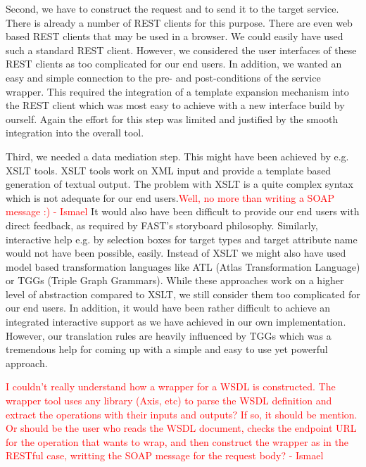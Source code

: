 \documentclass{fast_latex}
\begin{document}
Second, we have to construct the request and to send it to the target service. There is already a number of REST clients 
for this purpose. There are even web based REST clients that may be used in a browser. We could easily have used such 
a standard REST client. However, we considered the user interfaces of these REST clients as too complicated for our
end users. In addition, we wanted an easy and simple connection to the pre- and post-conditions of the service wrapper. 
This required the integration of a template expansion mechanism into the REST client which was most easy to achieve 
with a new interface build by ourself. Again the effort for this step was limited and justified by the smooth integration into the overall tool. 

Third, we needed a data mediation step. This might have been achieved by e.g. XSLT tools. XSLT tools work on 
XML input and provide a template based generation of textual output. The problem with XSLT is a quite 
complex syntax which is not adequate for our end users.\textcolor{red}{Well, no more than writing a SOAP message :) - Ismael} It would also have been difficult to provide our end users with direct feedback, as required by FAST's storyboard philosophy. Similarly, interactive help e.g. by selection boxes for target types and target attribute name would not have been possible, easily. Instead of XSLT we might also have used model based transformation languages like ATL (Atlas Transformation Language) or TGGs (Triple Graph Grammars). While these approaches work on a higher level of abstraction compared to XSLT, we still consider them too complicated for our end users. 
In addition, it would have been rather difficult to achieve an integrated interactive support as we have achieved in our 
own implementation. However, our translation rules are heavily influenced by TGGs which was a tremendous help 
for coming up with a simple and easy to use yet powerful approach. 

\textcolor{red}{I couldn't really understand how a wrapper for a WSDL is constructed. The wrapper tool uses any library (Axis, etc) to parse the WSDL definition and extract the operations with their inputs and outputs? If so, it should be mention. Or should be the user who reads the WSDL document, checks the endpoint URL for the operation that wants to wrap, and then construct the wrapper as in the RESTful case, writting the SOAP message for the request body? - Ismael}

\end{document}

